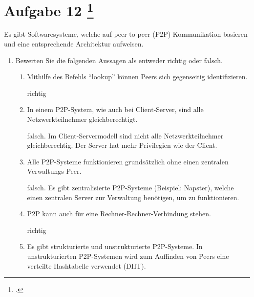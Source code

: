 \documentclass{lehramt-informatik-aufgabe}
\begin{document}
\section{Aufgabe 12
\footcite{examen:66116:2021:03}}

Es gibt Softwaresysteme, welche auf peer-to-peer (P2P) Kommunikation
basieren und eine entsprechende Architektur aufweisen.

\begin{enumerate}


\item Bewerten Sie die folgenden Aussagen als entweder richtig oder
falsch.

\begin{enumerate}
\item Mithilfe des Befehls “lookup” können Peers sich
gegenseitig identifizieren.

\begin{liAntwort}
richtig
\end{liAntwort}

\item In einem P2P-System, wie auch bei Client-Server, sind alle
Netzwerkteilnehmer gleichberechtigt.

\begin{liAntwort}
falsch. Im Client-Servermodell sind nicht alle Netzwerkteilnehmer
gleichberechtig. Der Server hat mehr Privilegien wie der Client.
\end{liAntwort}

\item Alle P2P-Systeme funktionieren grundsätzlich ohne einen
zentralen Verwaltungs-Peer.

\begin{liAntwort}
falsch. Es gibt zentralisierte P2P-Systeme (Beispiel: Napster), welche
einen zentralen Server zur Verwaltung benötigen, um zu funktionieren.
\end{liAntwort}

\item P2P kann auch für eine Rechner-Rechner-Verbindung
stehen.

\begin{liAntwort}
richtig
\end{liAntwort}

\item Es gibt strukturierte und unstrukturierte P2P-Systeme. In
unstrukturierten P2P-Systemen wird zum Auffinden von
Peers eine verteilte Hashtabelle verwendet (DHT).


\end{enumerate}
\end{enumerate}
\end{document}
